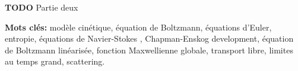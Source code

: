 


	\textbf{TODO} Partie deux

\noindent\textbf{Mots clés:}
modèle cinétique, %
    équation de Boltzmann, %
équations d'Euler, %
   entropie,
   équations de Navier-Stokes , %
   Chapman-Enskog development,
 équation de Boltzmann linéarisée,
  fonction Maxwellienne globale, 
 transport libre,
limites au temps grand,
 scattering.